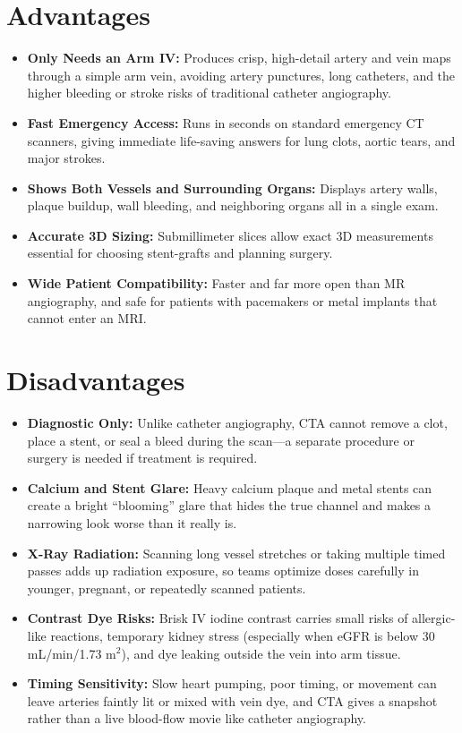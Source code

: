 \section{Advantages}
\begin{itemize}
    \item \textbf{Only Needs an Arm IV:} Produces crisp, high-detail artery and vein maps through a simple arm vein, avoiding artery punctures, long catheters, and the higher bleeding or stroke risks of traditional catheter angiography.
    \item \textbf{Fast Emergency Access:} Runs in seconds on standard emergency CT scanners, giving immediate life-saving answers for lung clots, aortic tears, and major strokes.
    \item \textbf{Shows Both Vessels and Surrounding Organs:} Displays artery walls, plaque buildup, wall bleeding, and neighboring organs all in a single exam.
    \item \textbf{Accurate 3D Sizing:} Submillimeter slices allow exact 3D measurements essential for choosing stent-grafts and planning surgery.
    \item \textbf{Wide Patient Compatibility:} Faster and far more open than MR angiography, and safe for patients with pacemakers or metal implants that cannot enter an MRI.
\end{itemize}

\section{Disadvantages}
\begin{itemize}
    \item \textbf{Diagnostic Only:} Unlike catheter angiography, CTA cannot remove a clot, place a stent, or seal a bleed during the scan---a separate procedure or surgery is needed if treatment is required.
    \item \textbf{Calcium and Stent Glare:} Heavy calcium plaque and metal stents can create a bright ``blooming'' glare that hides the true channel and makes a narrowing look worse than it really is.
    \item \textbf{X-Ray Radiation:} Scanning long vessel stretches or taking multiple timed passes adds up radiation exposure, so teams optimize doses carefully in younger, pregnant, or repeatedly scanned patients.
    \item \textbf{Contrast Dye Risks:} Brisk IV iodine contrast carries small risks of allergic-like reactions, temporary kidney stress (especially when eGFR is below 30 mL/min/1.73 m$^2$), and dye leaking outside the vein into arm tissue.
    \item \textbf{Timing Sensitivity:} Slow heart pumping, poor timing, or movement can leave arteries faintly lit or mixed with vein dye, and CTA gives a snapshot rather than a live blood-flow movie like catheter angiography.
\end{itemize}

